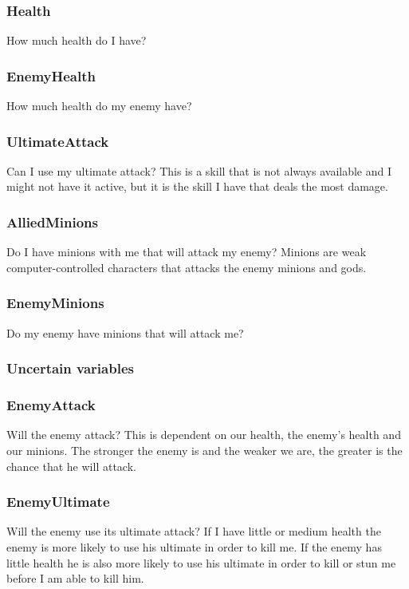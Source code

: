 \documentclass[titlepage]{article}
\begin{document}
\subsubsection*{Health}
How much health do I have?

\subsubsection*{EnemyHealth}
How much health do my enemy have?

\subsubsection*{UltimateAttack}
Can I use my ultimate attack? This is a skill that is not always available and I might not have it active, but it is the skill I have that deals the most damage.

\subsubsection*{AlliedMinions}
Do I have minions with me that will attack my enemy? Minions are weak computer-controlled characters that attacks the enemy minions and gods.

\subsubsection*{EnemyMinions}
Do my enemy have minions that will attack me?



\subsubsection{Uncertain variables}

\subsubsection*{EnemyAttack}
Will the enemy attack? This is dependent on our health, the enemy's health and our minions. The stronger the enemy is and the weaker we are, the greater is the chance that he will attack.

\subsubsection*{EnemyUltimate}
Will the enemy use its ultimate attack? If I have little or medium health the enemy is more likely to use his ultimate in order to kill me. If the enemy has little health he is also more likely to use his ultimate in order to kill or stun me before I am able to kill him.
\end{document}
